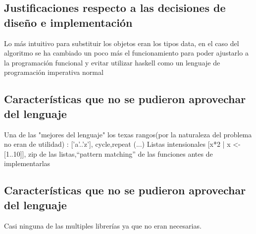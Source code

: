\documentclass[12pt,a4paper]{article}
\begin{document}
       \subsection{Justificaciones respecto a las decisiones de diseño e implementación}
       Lo más intuitivo para substituir los objetos eran los tipos data, en el caso del algoritmo se ha cambiado un poco más el funcionamiento para poder ajustarlo a la programación funcional y evitar utilizar haskell como un lenguaje de programación imperativa normal
       \subsection{Características que no se pudieron aprovechar del lenguaje}
       Una de las "mejores del lenguaje" los texas rangos(por la naturaleza del problema no eran de utilidad) : ['a'..'z'], cycle,repeat (...) Listas intensionales [x*2 | x <- [1..10]], zip de las listas,“pattern matching” de las funciones antes de implementarlas



\subsection{Características que no se pudieron aprovechar del lenguaje}
Casi ninguna de las multiples librerías ya que no eran necesarias.
\end{document}
